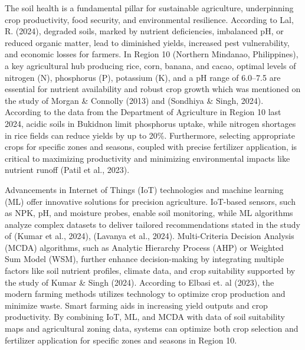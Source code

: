 {The soil health is a fundamental pillar for sustainable agriculture, underpinning crop productivity, food security, and environmental resilience. According to Lal, R. (2024), degraded soils, marked by nutrient deficiencies, imbalanced pH, or reduced organic matter, lead to diminished yields, increased pest vulnerability, and economic losses for farmers. In Region 10 (Northern Mindanao, Philippines), a key agricultural hub producing rice, corn, banana, and cacao, optimal levels of nitrogen (N), phosphorus (P), potassium (K), and a pH range of 6.0–7.5 are essential for nutrient availability and robust crop growth which was mentioned on the study of Morgan \& Connolly (2013) and (Sondhiya \& Singh, 2024). According to the data from the Department of Agriculture in Region 10 last 2024, acidic soils in Bukidnon limit phosphorus uptake, while nitrogen shortages in rice fields can reduce yields by up to 20\%. Furthermore, selecting appropriate crops for specific zones and seasons, coupled with precise fertilizer application, is critical to maximizing productivity and minimizing environmental impacts like nutrient runoff (Patil et al., 2023).

Advancements in Internet of Things (IoT) technologies and machine learning (ML) offer innovative solutions for precision agriculture. IoT-based sensors, such as NPK, pH, and moisture probes, enable  soil monitoring, while ML algorithms analyze complex datasets to deliver tailored recommendations stated in the study of (Kumar et al., 2024), (Lavanya et al., 2024). Multi-Criteria Decision Analysis (MCDA) algorithms, such as Analytic Hierarchy Process (AHP) or Weighted Sum Model (WSM), further enhance decision-making by integrating multiple factors like soil nutrient profiles, climate data, and crop suitability supported by the study of Kumar \& Singh (2024). According to Elbasi et. al (2023), the modern farming methods utilizes technology to optimize crop production and minimize waste. Smart farming aids in increasing yield outputs and crop productivity. By combining IoT, ML, and MCDA with data of soil suitability maps and agricultural zoning data, systems can optimize both crop selection and fertilizer application for specific zones and seasons in Region 10.

}
